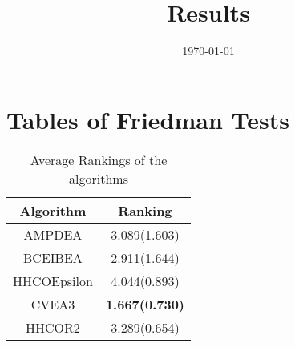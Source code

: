 \documentclass{article}
\title{Results}
\author{}
\date{\today}
\begin{document}
\oddsidemargin 0in \topmargin 0in\maketitle
\section{Tables of Friedman Tests}
\begin{table}[!htp]
\centering
\caption{Average Rankings of the algorithms
}\begin{tabular}{|c|c|}
\hline
Algorithm&Ranking\\
\hline
AMPDEA&3.089(1.603)\\\hline
BCEIBEA&2.911(1.644)\\\hline
HHCOEpsilon&4.044(0.893)\\\hline
CVEA3& {\bf 1.667(0.730)}\\\hline
HHCOR2&3.289(0.654)\\\hline
\end{tabular}
\end{table}
\end{document}
